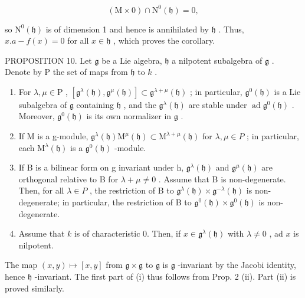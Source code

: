 \[
(\mathrm{M} \times 0) \cap \mathrm{N} ^ {0} (\mathfrak {h}) = 0,
\]

so \(\mathrm{N}^0 (\mathfrak{h})\) is of dimension 1 and hence is annihilated by \(\mathfrak{h}\) . Thus, \(x.a - f(x) = 0\) for all \(x\in \mathfrak{h}\) , which proves the corollary.

PROPOSITION 10. Let \(\mathfrak{g}\) be a Lie algebra, \(\mathfrak{h}\) a nilpotent subalgebra of \(\mathfrak{g}\) . Denote by P the set of maps from \(\mathfrak{h}\) to \(k\) .

\begin{enumerate}
\def\labelenumi{(\roman{enumi})}
\item
  For \(\lambda, \mu \in \mathrm{P}\) , \([\mathfrak{g}^{\lambda}(\mathfrak{h}), \mathfrak{g}^{\mu}(\mathfrak{h})] \subset \mathfrak{g}^{\lambda + \mu}(\mathfrak{h})\) ; in particular, \(\mathfrak{g}^{0}(\mathfrak{h})\) is a Lie subalgebra of \(\mathfrak{g}\) containing \(\mathfrak{h}\) , and the \(\mathfrak{g}^{\lambda}(\mathfrak{h})\) are stable under \(\operatorname{ad} \mathfrak{g}^{0}(\mathfrak{h})\) . Moreover, \(\mathfrak{g}^{0}(\mathfrak{h})\) is its own normalizer in \(\mathfrak{g}\) .
\item
  If M is a g-module, \(\mathfrak{g}^{\lambda}(\mathfrak{h})\mathrm{M}^{\mu}(\mathfrak{h})\subset\mathrm{M}^{\lambda+\mu}(\mathfrak{h})\) for \(\lambda,\mu\in P\) ; in particular, each \(\mathrm{M}^{\lambda}(\mathfrak{h})\) is a \(\mathfrak{g}^{0}(\mathfrak{h})\) -module.
\item
  If B is a bilinear form on g invariant under h, \(\mathfrak{g}^{\lambda}(\mathfrak{h})\) and \(\mathfrak{g}^{\mu}(\mathfrak{h})\) are orthogonal relative to B for \(\lambda + \mu \neq 0\) . Assume that B is non-degenerate. Then, for all \(\lambda \in P\) , the restriction of B to \(\mathfrak{g}^{\lambda}(\mathfrak{h}) \times \mathfrak{g}^{-\lambda}(\mathfrak{h})\) is non-degenerate; in particular, the restriction of B to \(\mathfrak{g}^{0}(\mathfrak{h}) \times \mathfrak{g}^{0}(\mathfrak{h})\) is non-degenerate.
\item
  Assume that \(k\) is of characteristic 0. Then, if \(x \in \mathfrak{g}^{\lambda}(\mathfrak{h})\) with \(\lambda \neq 0\) , ad \(x\) is nilpotent.
\end{enumerate}

The map \((x,y)\mapsto [x,y]\) from \(\mathfrak{g}\times \mathfrak{g}\) to \(\mathfrak{g}\) is \(\mathfrak{g}\) -invariant by the Jacobi identity, hence \(\mathfrak{h}\) -invariant. The first part of (i) thus follows from Prop. 2 (ii). Part (ii) is proved similarly.

